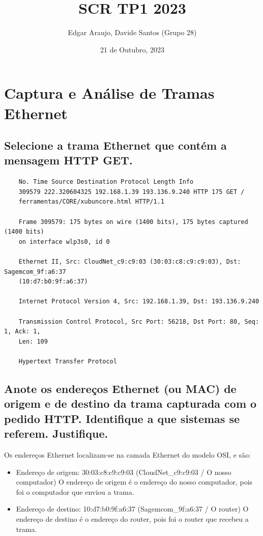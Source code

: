 \documentclass{article}
\title{SCR TP1 2023}
\author{Edgar Araujo, Davide Santos (Grupo 28)}
\date{21 de Outubro, 2023}
\begin{document}
\maketitle

\section{Captura e Análise de Tramas Ethernet}
\subsection*{Selecione a trama Ethernet que contém a mensagem HTTP GET.}

\begin{verbatim}
    No. Time Source Destination Protocol Length Info
    309579 222.320604325 192.168.1.39 193.136.9.240 HTTP 175 GET /
    ferramentas/CORE/xubuncore.html HTTP/1.1

    Frame 309579: 175 bytes on wire (1400 bits), 175 bytes captured (1400 bits) 
    on interface wlp3s0, id 0

    Ethernet II, Src: CloudNet_c9:c9:03 (30:03:c8:c9:c9:03), Dst: Sagemcom_9f:a6:37
    (10:d7:b0:9f:a6:37)

    Internet Protocol Version 4, Src: 192.168.1.39, Dst: 193.136.9.240

    Transmission Control Protocol, Src Port: 56218, Dst Port: 80, Seq: 1, Ack: 1, 
    Len: 109

    Hypertext Transfer Protocol
\end{verbatim}

\subsection{Anote os endereços Ethernet (ou MAC) de origem e de destino da trama
capturada com o pedido HTTP. Identifique a que sistemas se referem. Justifique.}

Os endereços Ethernet localizam-se na camada Ethernet do modelo OSI, e são:
\begin{itemize}
    \item Endereço de origem: 30:03:c8:c9:c9:03 (CloudNet\_c9:c9:03 / O nosso computador) \linebreak
    O endereço de origem é o endereço do nosso computador, pois foi o computador que enviou a trama.
    \item Endereço de destino: 10:d7:b0:9f:a6:37 (Sagemcom\_9f:a6:37 / O router) \linebreak
    O endereço de destino é o endereço do router, pois foi o router que recebeu a trama.
\end{itemize}
\end{document}
